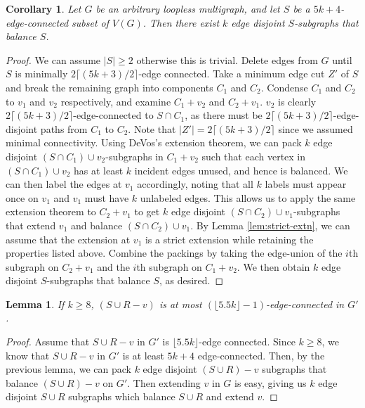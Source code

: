 \documentclass{article}
\newtheorem{lemma}{Lemma}[section]
\newtheorem{corollary}{Corollary}[section]
\begin{document}
\begin{corollary}
    Let $G$ be an arbitrary loopless multigraph, and let $S$ be a $5k+4$-edge-connected subset of $V(G)$. Then there exist $k$ edge disjoint $S$-subgraphs that balance $S$. 
\end{corollary}

\begin{proof}
    We can assume $|S| \geq 2$ otherwise this is trivial. Delete edges from $G$ until $S$ is minimally $2 \lceil (5k+3)/2 \rceil$-edge connected. Take a minimum edge cut $Z'$ of $S$ and break the remaining graph into components $C_1$ and $C_2$. Condense $C_1$ and $C_2$ to $v_1$ and $v_2$ respectively, and examine $C_1+v_2$ and $C_2+v_1$. $v_2$ is clearly $2 \lceil (5k+3)/2 \rceil$-edge-connected to $S \cap C_1$, as there must be $2 \lceil (5k+3)/2 \rceil$-edge-disjoint paths from $C_1$ to $C_2$. Note that $|Z'|=2 \lceil (5k+3)/2 \rceil$ since we assumed minimal connectivity. Using DeVos's extension theorem, we can pack $k$ edge disjoint $(S \cap C_1) \cup v_2$-subgraphs in $C_1+v_2$ such that each vertex in $(S \cap C_1) \cup v_2$ has at least $k$ incident edges unused, and hence is balanced. We can then label the edges at $v_1$ accordingly, noting that all $k$ labels must appear once on $v_1$ and $v_1$ must have $k$ unlabeled edges. This allows us to apply the same extension theorem to $C_2+v_1$ to get $k$ edge disjoint $(S \cap C_2) \cup v_1$-subgraphs that extend $v_1$ and balance $(S \cap C_2) \cup v_1$. By Lemma \ref{lem:strict-extn}, we can assume that the extension at $v_1$ is a strict extension while retaining the properties listed above. Combine the packings by taking the edge-union of the $i$th subgraph on $C_2+v_1$ and the $i$th subgraph on $C_1+v_2$. We then obtain $k$ edge disjoint $S$-subgraphs that balance $S$, as desired.
\end{proof}

\begin{lemma}\label{lem:5.5conn} 
    If $k \geq 8$, $(S \cup R-v)$ is at most $(\lfloor 5.5k \rfloor-1)$-edge-connected in $G'$. 
\end{lemma}

\begin{proof}
    Assume that $S \cup R-v$ in $G'$ is $\lfloor 5.5k \rfloor$-edge connected. Since $k \geq 8$, we know that $S \cup R-v$ in $G'$ is at least $5k+4$ edge-connected. Then, by the previous lemma, we can pack $k$ edge disjoint $(S \cup R)-v$ subgraphs that balance $(S \cup R)-v$ on $G'$. Then extending $v$ in $G$ is easy, giving us $k$ edge disjoint $S \cup R$ subgraphs which balance $S\cup R$ and extend $v$. 
\end{proof}
\end{document}
